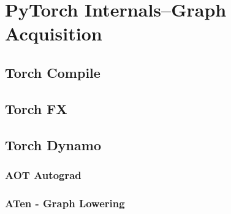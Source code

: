       \subsection*{}\label{subsubsubsec:grad_modes}


\section{PyTorch Internals--Graph Acquisition}
  \subsection*{Torch Compile}\label{subsec:torch_compile}
    
    
    \subsection*{Torch FX}\label{subsec:fx_graph}
      
    \subsection{}
    \subsection{Torch Dynamo\hfill\normalsize{}}
      
    \subsubsection{AOT Autograd\hfill\normalsize{}}
      
    \subsubsection*{ATen - Graph Lowering}
      
        
        
